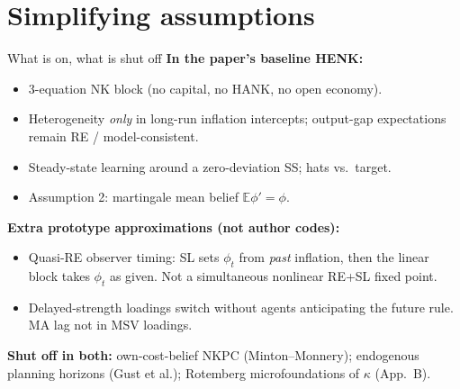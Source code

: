 \documentclass[11pt,aspectratio=169]{beamer}
\begin{document}
\section{Simplifying assumptions}
\begin{frame}{What is on, what is shut off}
  \textbf{In the paper's baseline HENK:}
  \begin{itemize}
    \item 3-equation NK block (no capital, no HANK, no open economy).
    \item Heterogeneity \emph{only} in long-run inflation intercepts;
          output-gap expectations remain RE / model-consistent.
    \item Steady-state learning around a zero-deviation SS; hats vs.\ target.
    \item Assumption 2: martingale mean belief $\mathbb{E}\phi'=\phi$.
  \end{itemize}
  \textbf{Extra prototype approximations (not author codes):}
  \begin{itemize}
    \item Quasi-RE observer timing: SL sets $\phi_t$ from \emph{past}
          inflation, then the linear block takes $\phi_t$ as given.
          Not a simultaneous nonlinear RE+SL fixed point.
    \item Delayed-strength loadings switch without agents anticipating
          the future rule. MA lag not in MSV loadings.
  \end{itemize}
  \textbf{Shut off in both:} own-cost-belief NKPC (Minton--Monnery);
  endogenous planning horizons (Gust et al.); Rotemberg microfoundations
  of $\kappa$ (App.~B).
\end{frame}

\end{document}
